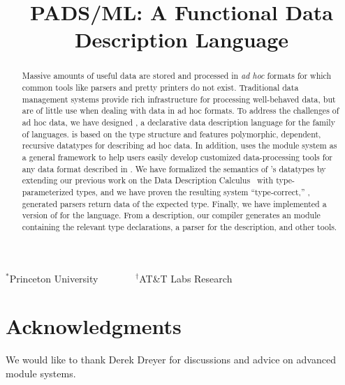 \documentclass[nocopyrightspace]{sigplanconf}
\begin{document}
\title{PADS/ML: A Functional Data Description Language}
{$^\ast$Princeton University \ \ \ \ \ \ \ $^\dagger$AT\&T Labs Research}
 { \ \ \ \ }



\maketitle{}

\begin{abstract}  

  Massive amounts of useful data are stored and processed in
  \textit{ad hoc} formats for which common tools like parsers and
  pretty printers do not exist.  Traditional data management systems
  provide rich infrastructure for processing well-behaved data, but
  are of little use when dealing with data in ad hoc formats.  To
  address the challenges of ad hoc data, we have designed \padsml{}, a
  declarative data description language for the \ml{} family of
  languages.  \padsml{} is based on the \ml{} type structure and
  features polymorphic, dependent, recursive datatypes for describing
  ad hoc data.  In addition, \padsml{} uses the \ml{} module system as
  a general framework to help users easily develop customized
  data-processing tools for any data format described in \padsml{}.
  We have formalized the semantics of \padsml{}'s datatypes by
  extending our previous work on the Data Description
  Calculus~\cite{fisher+:next700ddl} with type-parameterized types,
  and we have proven the resulting system ``type-correct,'' \ie{},
  generated parsers return data of the expected type.  Finally, we
  have implemented a version of \padsml{} for the \ocaml{} language.
  From a \padsml{} description, our compiler generates an \ocaml{}
  module containing the relevant type declarations, a parser for the
  description, and other tools.

\end{abstract}















\section*{Acknowledgments}

We would like to thank Derek Dreyer for discussions and advice on
advanced module systems.



%


\end{document}
